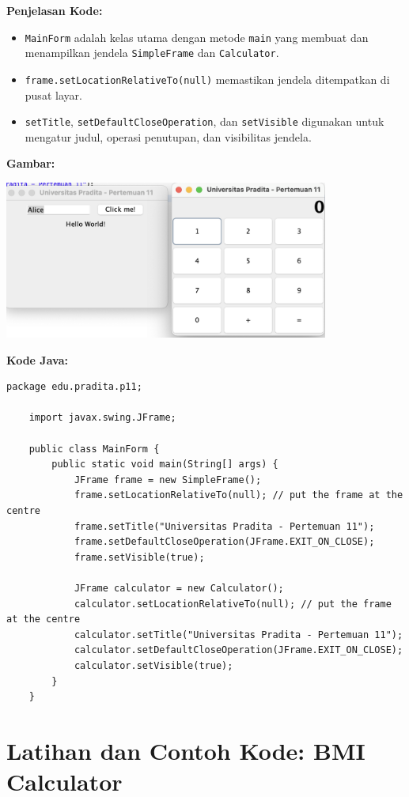 \textbf{Penjelasan Kode:}
\begin{itemize}
	\item \texttt{MainForm} adalah kelas utama dengan metode \texttt{main} yang membuat dan menampilkan jendela \texttt{SimpleFrame} dan \texttt{Calculator}.
	\item \texttt{frame.setLocationRelativeTo(null)} memastikan jendela ditempatkan di pusat layar.
	\item \texttt{setTitle}, \texttt{setDefaultCloseOperation}, dan \texttt{setVisible} digunakan untuk mengatur judul, operasi penutupan, dan visibilitas jendela.
\end{itemize}

\textbf{Gambar:} \\
\begin{center}
	\includegraphics[width=0.8\textwidth]{assets/pertemuan11/main_form.png}
\end{center}

\textbf{Kode Java:}
\begin{lstlisting}[style=JavaStyle]
	package edu.pradita.p11;
	
	import javax.swing.JFrame;
	
	public class MainForm {
		public static void main(String[] args) {
			JFrame frame = new SimpleFrame();
			frame.setLocationRelativeTo(null); // put the frame at the centre
			frame.setTitle("Universitas Pradita - Pertemuan 11");
			frame.setDefaultCloseOperation(JFrame.EXIT_ON_CLOSE);
			frame.setVisible(true);
			
			JFrame calculator = new Calculator();
			calculator.setLocationRelativeTo(null); // put the frame at the centre
			calculator.setTitle("Universitas Pradita - Pertemuan 11");
			calculator.setDefaultCloseOperation(JFrame.EXIT_ON_CLOSE);
			calculator.setVisible(true);
		}
	}
\end{lstlisting}


\section{Latihan dan Contoh Kode: BMI Calculator}

